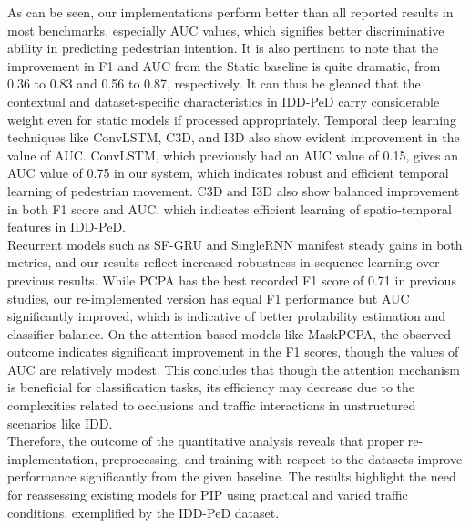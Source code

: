 \documentclass[12pt, a4paper]{article}
\begin{document}
As can be seen, our implementations perform better than all reported results in most benchmarks, especially AUC values, which signifies better discriminative ability in predicting pedestrian intention. It is also pertinent to note that the improvement in F1 and AUC from the Static baseline is quite dramatic, from 0.36 to 0.83 and 0.56 to 0.87, respectively. It can thus be gleaned that the contextual and dataset-specific characteristics in IDD-PeD carry considerable weight even for static models if processed appropriately. Temporal deep learning techniques like ConvLSTM, C3D, and I3D also show evident improvement in the value of AUC. ConvLSTM, which previously had an AUC value of 0.15, gives an AUC value of 0.75 in our system, which indicates robust and efficient temporal learning of pedestrian movement. C3D and I3D also show balanced improvement in both F1 score and AUC, which indicates efficient learning of spatio-temporal features in IDD-PeD.\\

Recurrent models such as SF-GRU and SingleRNN manifest steady gains in both metrics, and our results reflect increased robustness in sequence learning over previous results. While PCPA \cite{rasouli2019pie} has the best recorded F1 score of 0.71 in previous studies, our re-implemented version has equal F1 performance but AUC significantly improved, which is indicative of better probability estimation and classifier balance. On the attention-based models like MaskPCPA, the observed outcome indicates significant improvement in the F1 scores, though the values of AUC are relatively modest. This concludes that though the attention mechanism is beneficial for classification tasks, its efficiency may decrease due to the complexities related to occlusions and traffic interactions in unstructured scenarios like IDD. \\

Therefore, the outcome of the quantitative analysis reveals that proper re-implementation, preprocessing, and training with respect to the datasets improve performance significantly from the given baseline. The results highlight the need for reassessing existing models for PIP using practical and varied traffic conditions, exemplified by the IDD-PeD dataset.
\end{document}
